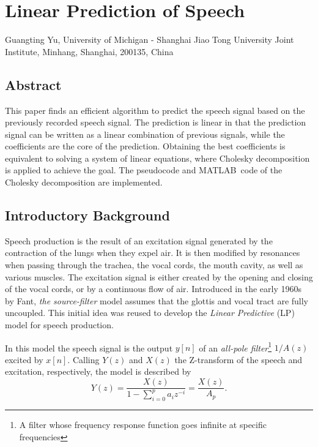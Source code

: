 \chapter{Linear Prediction of Speech}
\begin{center}
Guangting Yu, University of Michigan - Shanghai Jiao Tong University Joint Institute, Minhang, Shanghai, 200135, China
\end{center}


\section*{Abstract}
This paper finds an efficient algorithm to predict the speech signal based on the previously recorded speech signal.
The prediction is linear in that the prediction signal can be written as a linear combination of previous signals, while the coefficients are the core of the prediction.
Obtaining the best coefficients is equivalent to solving a system of linear equations, where Cholesky decomposition is applied to achieve the goal.
The pseudocode and MATLAB\texttrademark\ code of the Cholesky decomposition are implemented.


\section{Introductory Background}
Speech production is the result of an excitation signal generated by the contraction of the lungs when they expel air.
It is then modified by resonances when passing through the trachea, the vocal cords, the mouth cavity, as well as various muscles.
The excitation signal is either created by the opening and closing of the vocal cords, or by a continuous flow of air.
Introduced in the early 1960s by Fant, \textit{the source-filter} model assumes that the glottis and vocal tract are fully uncoupled.
This initial idea was reused to develop the \textit{Linear Predictive} (LP) model for speech production.\cite{dutoit}

In this model the speech signal is the output \(y[n]\) of an \textit{all-pole filter}\footnote{A filter whose frequency response function goes infinite at specific frequencies} \(1/A(z)\) excited by \(x[n]\).
Calling \(Y(z)\) and \(X(z)\) the Z-transform of the speech and excitation, respectively, the model is described by
\begin{equation}
Y(z)=\frac{X(z)}{1-\sum_{i=0}^p a_i z^{-i}}=\frac{X(z)}{A_p}.
\end{equation}

